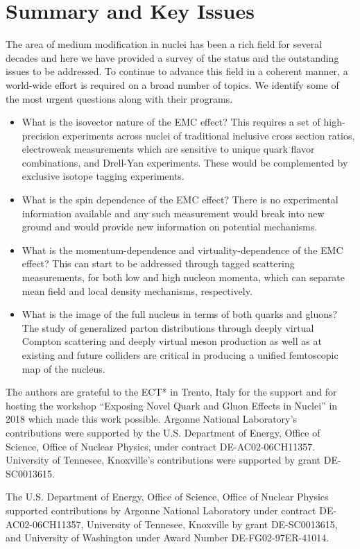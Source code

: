 \section{Summary and Key Issues\label{sec:conclusion}}
%
The area of medium modification in nuclei has been a rich field for several decades and here we have provided a survey of the status and the outstanding issues to be addressed.  To continue to advance this field in a coherent manner, a world-wide effort is required on a broad number of topics.  We identify some of the most urgent questions along with their programs.

\begin{itemize}
    \item{What is the isovector nature of the EMC effect?  This requires a set of high-precision experiments across nuclei of traditional inclusive cross section ratios, electroweak measurements which are sensitive to unique quark flavor combinations, and Drell-Yan experiments.  These would be complemented by exclusive isotope tagging experiments.}
    \item{What is the spin dependence of the EMC effect?  There is no experimental information available and any such measurement would break into new ground and would provide new information on potential mechanisms.}
    \item{What is the momentum-dependence and virtuality-dependence of the EMC effect?  This can start to be addressed through tagged scattering measurements, for both low and high nucleon momenta, which can separate mean field and local density mechanisms, respectively.}
    \item{What is the image of the full nucleus in terms of both quarks and gluons?  The study of generalized parton distributions through deeply virtual Compton scattering and deeply virtual meson production as well as at existing and future colliders are critical in producing a unified femtoscopic map of the nucleus.}
\end{itemize}

\begin{acknowledgments}
The authors are grateful to the ECT* in Trento, Italy for the support and for hosting the workshop ``Exposing Novel Quark and Gluon Effects in Nuclei'' in 2018 which made this work possible.  Argonne National Laboratory's contributions were supported by the U.S. Department of Energy, Office of Science, Office of Nuclear Physics, under contract DE-AC02-06CH11357.  University of Tennesee, Knoxville's contributions were supported by grant DE-SC0013615.  

The U.S. Department of Energy, Office of Science, Office of Nuclear Physics supported contributions by Argonne National Laboratory under contract DE-AC02-06CH11357, University of Tennesee, Knoxville by grant DE-SC0013615, and University of Washington under Award Number DE-FG02-97ER-41014.

\end{acknowledgments}
